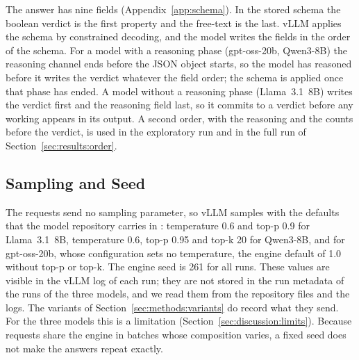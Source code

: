 The answer has nine fields (Appendix~\ref{app:schema}). In the stored schema the boolean verdict  is the first property and the free-text  is the last. vLLM applies the schema by constrained decoding, and the model writes the fields in the order of the schema. For a model with a reasoning phase (gpt-oss-20b, Qwen3-8B) the reasoning channel ends before the JSON object starts, so the model has reasoned before it writes the verdict whatever the field order; the schema is applied once that phase has ended. A model without a reasoning phase (Llama~3.1~8B) writes the verdict first and the reasoning field last, so it commits to a verdict before any working appears in its output. A second order, with the reasoning and the counts before the verdict, is used in the exploratory run and in the full run of Section~\ref{sec:results:order}.

\subsection{Sampling and Seed}
\label{sec:methods:sampling}

The requests send no sampling parameter, so vLLM samples with the defaults that the model repository carries in : temperature 0.6 and top-p 0.9 for Llama~3.1~8B, temperature 0.6, top-p 0.95 and top-k 20 for Qwen3-8B, and for gpt-oss-20b, whose configuration sets no temperature, the engine default of 1.0 without top-p or top-k. The engine seed is 261 for all runs. These values are visible in the vLLM log of each run; they are not stored in the run metadata of the runs of the three models, and we read them from the repository files and the logs. The variants of Section~\ref{sec:methods:variants} do record what they send. For the three models this is a limitation (Section~\ref{sec:discussion:limits}). Because requests share the engine in batches whose composition varies, a fixed seed does not make the answers repeat exactly.

